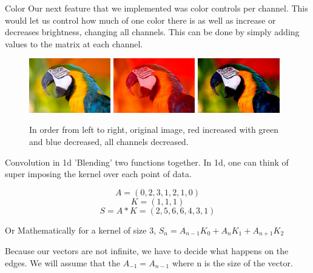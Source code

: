 \documentclass{beamer}
\begin{document}
\begin{frame}{Color}
Our next feature that we implemented was color controls per channel. This would let us control how much of one color there is as well as increase or decreases brightness, changing all channels. This can be done by simply adding values to the matrix at each channel.

\begin{figure}[ht]
\includegraphics[width=1.4in]{parrot.jpg}
\hspace{.1in} 
\includegraphics[width=1.4in]{parrotout1.jpg}
\hspace{.1in}
\includegraphics[width=1.4in]{parrotout2.jpg}
\hspace{.1in}
\caption{In order from left to right, original image, red increased with green and blue decreased, all channels decreased.}
\end{figure}
\end{frame}


\begin{frame} {Convolution in 1d}
'Blending' two functions together. In 1d, one can think of super imposing the kernel over each point of data.

$$A = (0,2,3,1,2,1,0)$$
$$K = (1,1,1)$$ 
$$S = A*K = (2,5,6,6,4,3,1)$$

Or Mathematically for a kernel of size 3, $S_n = A_{n-1}K_{0}+A_{n}K_{1}+A_{n+1}K_{2}$

Because our vectors are not infinite, we have to decide what happens on the edges. We will assume that the $A_{-1} = A_{n-1}$ where n is the size of the vector.
\end{frame}
\end{document}
